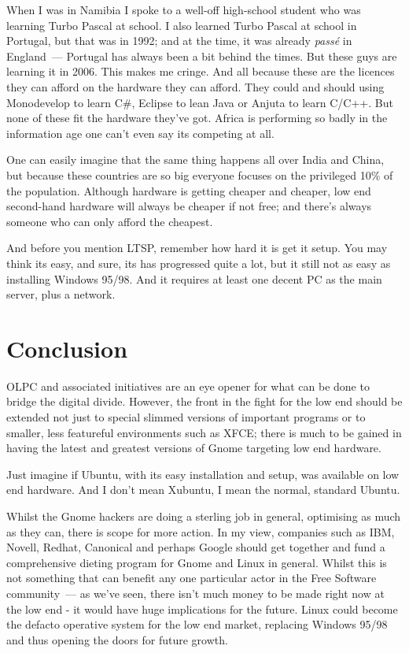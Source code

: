 \documentclass{memoir}
\begin{document}
When I was in Namibia I spoke to a well-off high-school student who
was learning Turbo Pascal at school. I also learned Turbo Pascal at
school in Portugal, but that was in 1992; and at the time, it was already
\emph{pass\'e} in England~--- Portugal has always been a bit behind
the times. But these guys are learning it in 2006. This makes me
cringe. And all because these are the licences they can afford on the
hardware they can afford. They could and should using Monodevelop to
learn C\#, Eclipse to lean Java or Anjuta to learn C/C++. But none of
these fit the hardware they've got. Africa is performing so badly in
the information age one can't even say its competing at all.

One can easily imagine that the same thing happens all over India and
China, but because these countries are so big everyone focuses on the
privileged 10\% of the population. Although hardware is getting
cheaper and cheaper, low end second-hand hardware will always be
cheaper if not free; and there's always someone who can only afford
the cheapest.

And before you mention LTSP, remember how hard it is get it setup. You
may think its easy, and sure, its has progressed quite a lot, but it
still not as easy as installing Windows 95/98. And it requires at
least one decent PC as the main server, plus a network.

\section{Conclusion}

OLPC and associated initiatives are an eye opener for what can be done
to bridge the digital divide. However, the front in the fight for the
low end should be extended not just to special slimmed versions of
important programs or to smaller, less featureful environments such as
XFCE; there is much to be gained in having the latest and greatest
versions of Gnome targeting low end hardware.

Just imagine if Ubuntu, with its easy installation and setup, was
available on low end hardware. And I don't mean Xubuntu, I mean the
normal, standard Ubuntu.

Whilst the Gnome hackers are doing a sterling job in general,
optimising as much as they can, there is scope for more action. In my
view, companies such as IBM, Novell, Redhat, Canonical and perhaps
Google should get together and fund a comprehensive dieting program
for Gnome and Linux in general. Whilst this is not something that can
benefit any one particular actor in the Free Software community~--- as
we've seen, there isn't much money to be made right now at the low end
- it would have huge implications for the future. Linux could become
the defacto operative system for the low end market, replacing Windows
95/98 and thus opening the doors for future growth.
\end{document}
